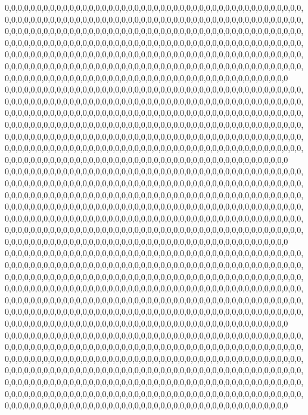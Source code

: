 0,0,0,0,0,0,0,0,0,0,0,0,0,0,0,0,0,0,0,0,0,0,0,0,0,0,0,0,0,0,0,0,0,0,0,0,0,0,0,0,0,0,0,0,0,0,0,0,0,0,0,0,0,0,0,0,0,0,0,0,0,0,0,0,0,0,0,0,0,0,0,0,0,0,0,0,0,0,0,0,0,0,0,0,0,0,0,0,0,0,0,0,0,0,0,0,0,0,0,0,0,0,0,0,0,0,0,0,0,0,0,0,0,0,0,0,0,0,0,0,0,0,0,0,0,0,0,0,0,0,0,0,0,0,0,0,0,0,0,0,0,0,0,0,0,0,0,0,0,0,0,0,0,0,0,0,0,0,0,0,0,0,0,0,0,0,0,0,0,0,0,0,0,0,0,0,0,0,0,0,0,0,0,0,0,0,0,0,0,0,0,0,0,0,0,0,0,0,0,0,0,0,0,0,0,0,0,0,0,0,0,0,0,0,0,0,0,0,0,0,0,0,0,0,0,0,0,0,0,0,0,0,0,0,0,0,0,0,0,0,0,0,0,0,0,0,0,0,0,0,0,0,0,0,0,0,0,0,0,0,0,0,0,0,0,0,0,0,0,0,0,0,0,0,0,0,0,0,0,0,0,0,0,0,0,0,0,0,0,0,0,0,0,0,0,0,0,0,0,0,0,0,0,0,0,0,0,0,0,0,0,0,0,0,0,0,0,0,0,0
0,0,0,0,0,0,0,0,0,0,0,0,0,0,0,0,0,0,0,0,0,0,0,0,0,0,0,0,0,0,0,0,0,0,0,0,0,0,0,0,0,0,0,0,0,0,0,0,0,0,0,0,0,0,0,0,0,0,0,0,0,0,0,0,0,0,0,0,0,0,0,0,0,0,0,0,0,0,0,0,0,0,0,0,0,0,0,0,0,0,0,0,0,0,0,0,0,0,0,0,0,0,0,0,0,0,0,0,0,0,0,0,0,0,0,0,0,0,0,0,0,0,0,0,0,0,0,0,0,0,0,0,0,0,0,0,0,0,0,0,0,0,0,0,0,0,0,0,0,0,0,0,0,0,0,0,0,0,0,0,0,0,0,0,0,0,0,0,0,0,0,0,0,0,0,0,0,0,0,0,0,0,0,0,0,0,0,0,0,0,0,0,0,0,0,0,0,0,0,0,0,0,0,0,0,0,0,0,0,0,0,0,0,0,0,0,0,0,0,0,0,0,0,0,0,0,0,0,0,0,0,0,0,0,0,0,0,0,0,0,0,0,0,0,0,0,0,0,0,0,0,0,0,0,0,0,0,0,0,0,0,0,0,0,0,0,0,0,0,0,0,0,0,0,0,0,0,0,0,0,0,0,0,0,0,0,0,0,0,0,0,0,0,0,0,0,0,0,0,0,0,0,0,0,0,0,0,0,0,0,0,0,0,0,0,0,0,0,0,0
0,0,0,0,0,0,0,0,0,0,0,0,0,0,0,0,0,0,0,0,0,0,0,0,0,0,0,0,0,0,0,0,0,0,0,0,0,0,0,0,0,0,0,0,0,0,0,0,0,0,0,0,0,0,0,0,0,0,0,0,0,0,0,0,0,0,0,0,0,0,0,0,0,0,0,0,0,0,0,0,0,0,0,0,0,0,0,0,0,0,0,0,0,0,0,0,0,0,0,0,0,0,0,0,0,0,0,0,0,0,0,0,0,0,0,0,0,0,0,0,0,0,0,0,0,0,0,0,0,0,0,0,0,0,0,0,0,0,0,0,0,0,0,0,0,0,0,0,0,0,0,0,0,0,0,0,0,0,0,0,0,0,0,0,0,0,0,0,0,0,0,0,0,0,0,0,0,0,0,0,0,0,0,0,0,0,0,0,0,0,0,0,0,0,0,0,0,0,0,0,0,0,0,0,0,0,0,0,0,0,0,0,0,0,0,0,0,0,0,0,0,0,0,0,0,0,0,0,0,0,0,0,0,0,0,0,0,0,0,0,0,0,0,0,0,0,0,0,0,0,0,0,0,0,0,0,0,0,0,0,0,0,0,0,0,0,0,0,0,0,0,0,0,0,0,0,0,0,0,0,0,0,0,0,0,0,0,0,0,0,0,0,0,0,0,0,0,0,0,0,0,0,0,0,0,0,0,0,0,0,0,0,0,0,0,0,0,0,0,0
0,0,0,0,0,0,0,0,0,0,0,0,0,0,0,0,0,0,0,0,0,0,0,0,0,0,0,0,0,0,0,0,0,0,0,0,0,0,0,0,0,0,0,0,0,0,0,0,0,0,0,0,0,0,0,0,0,0,0,0,0,0,0,0,0,0,0,0,0,0,0,0,0,0,0,0,0,0,0,0,0,0,0,0,0,0,0,0,0,0,0,0,0,0,0,0,0,0,0,0,0,0,0,0,0,0,0,0,0,0,0,0,0,0,0,0,0,0,0,0,0,0,0,0,0,0,0,0,0,0,0,0,0,0,0,0,0,0,0,0,0,0,0,0,0,0,0,0,0,0,0,0,0,0,0,0,0,0,0,0,0,0,0,0,0,0,0,0,0,0,0,0,0,0,0,0,0,0,0,0,0,0,0,0,0,0,0,0,0,0,0,0,0,0,0,0,0,0,0,0,0,0,0,0,0,0,0,0,0,0,0,0,0,0,0,0,0,0,0,0,0,0,0,0,0,0,0,0,0,0,0,0,0,0,0,0,0,0,0,0,0,0,0,0,0,0,0,0,0,0,0,0,0,0,0,0,0,0,0,0,0,0,0,0,0,0,0,0,0,0,0,0,0,0,0,0,0,0,0,0,0,0,0,0,0,0,0,0,0,0,0,0,0,0,0,0,0,0,0,0,0,0,0,0,0,0,0,0,0,0,0,0,0,0,0,0,0,0,0,0
0,0,0,0,0,0,0,0,0,0,0,0,0,0,0,0,0,0,0,0,0,0,0,0,0,0,0,0,0,0,0,0,0,0,0,0,0,0,0,0,0,0,0,0,0,0,0,0,0,0,0,0,0,0,0,0,0,0,0,0,0,0,0,0,0,0,0,0,0,0,0,0,0,0,0,0,0,0,0,0,0,0,0,0,0,0,0,0,0,0,0,0,0,0,0,0,0,0,0,0,0,0,0,0,0,0,0,0,0,0,0,0,0,0,0,0,0,0,0,0,0,0,0,0,0,0,0,0,0,0,0,0,0,0,0,0,0,0,0,0,0,0,0,0,0,0,0,0,0,0,0,0,0,0,0,0,0,0,0,0,0,0,0,0,0,0,0,0,0,0,0,0,0,0,0,0,0,0,0,0,0,0,0,0,0,0,0,0,0,0,0,0,0,0,0,0,0,0,0,0,0,0,0,0,0,0,0,0,0,0,0,0,0,0,0,0,0,0,0,0,0,0,0,0,0,0,0,0,0,0,0,0,0,0,0,0,0,0,0,0,0,0,0,0,0,0,0,0,0,0,0,0,0,0,0,0,0,0,0,0,0,0,0,0,0,0,0,0,0,0,0,0,0,0,0,0,0,0,0,0,0,0,0,0,0,0,0,0,0,0,0,0,0,0,0,0,0,0,0,0,0,0,0,0,0,0,0,0,0,0,0,0,0,0,0,0,0,0,0,0
